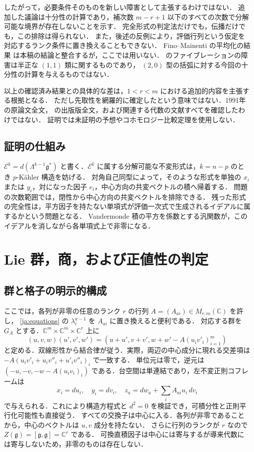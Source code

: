 \documentclass[12pt]{amsart}
\theoremstyle{definition}
\theoremstyle{remark}
\numberwithin{equation}{section}
\newcommand{\C}{\mathbb{C}}
\newcommand{\gfr}{\mathfrak g}
\newcommand{\Eex}{\mathcal E}
\begin{document}
したがって，必要条件そのものを新しい障害として主張するわけではない．
追加した議論は十分性の計算であり，補次数 $m-r+1$ 以下のすべての次数で分解可能な境界が存在しないことを示す．
完全形式の判定法だけでも，伝播だけでも，この排除は得られない．
また，後述の反例により，評価行列という仮定を対応するランク条件に置き換えることもできない．
Fino--Mainenti の平均化の結果 \cite[Lemma 2.4]{ja:FM} は本稿の結論と整合するが，ここでは用いない．
\cite[Theorem 3.1]{ja:FGM} のファイブレーションの障害は半正な $(1,1)$ 類に関するものであり，
$(2,0)$ 型の括弧に対する今回の十分性の計算を与えるものではない．

以上の確認済み結果との具体的な差は，$1<r<m$ における追加的内容を主張する根拠となる．
ただし先取性を網羅的に確定したという意味ではない．1991年の原論文全文，\cite{ja:LG} の出版版全文，および関連する代数の文献すべてを確認したわけではない．
証明では未証明の予想やコホモロジー比較定理を使用しない．

\subsection{証明の仕組み}
$\Eex^k=d(\Lambda^{k-1}\gfr^*)$ と書く．$\Eex^k$ に属する分解可能な不変形式は，$k=n-p$ のとき $p$-K\"ahler 構造を妨げる．
対角自己同型によって，そのような形式を単独の $x_i$ または $y_i$，対になった因子 $e_i$，中心方向の共変ベクトルの積へ帰着する．
問題の次数範囲では，閉性から中心方向の共変ベクトルを排除できる．
残った形式の完全性は，平方因子を持たない単項式が評価一次式で生成されるイデアルに属するかという問題となる．
Vandermonde 積の平方を係数とする汎関数が，このイデアルを消しながら各単項式上で非零になる．

\section{Lie 群，商，および正値性の判定}
\subsection{群と格子の明示的構成}
ここでは，各列が非零の任意のランク $r$ の行列 $A=(A_{ai})\in M_{r,m}(\C)$ を許し，
\eqref{ja:equations} の $\lambda_i^{a-1}$ を $A_{ai}$ に置き換えると便利である．
対応する群を $G_A$ とする．$\C^m\times\C^m\times\C^r$ 上に
\begin{equation}\label{ja:law}
 (u,v,w)(u',v',w')=
 \left(u+u',v+v',w+w'-A(u_i v'_i)_{i=1}^m\right)
\end{equation}
と定める．双線形性から結合律が従う．実際，両辺の中心成分に現れる交差項は
$-A(u_i v'_i+u_i v''_i+u'_i v''_i)_i$ で一致する．
単位元は零で，逆元は $(-u,-v,-w-A(u_i v_i)_i)$ である．台空間は単連結であり，左不変正則コフレームは
\[
 x_i=du_i,\quad y_i=dv_i,\quad
 z_a=dw_a+\sum_i A_{ai}u_i\,dv_i
\]
で与えられる．これにより構造方程式と $d^2=0$ を検証でき，可積分性と正則平行化可能性も直接従う．
すべての交換子は中心に入る．各列が非零であることから，中心のベクトルは $u,v$ 成分を持たない．
さらに行列のランクが $r$ なので $Z(\gfr)=[\gfr,\gfr]=\C^r$ である．
可換直積因子は中心には寄与するが導来代数には寄与しないため，非零のものは存在しない．
\end{document}
